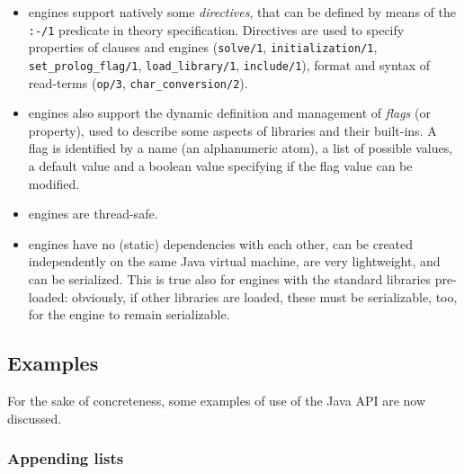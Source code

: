 \begin{itemize}
\item engines support natively some \emph{directives}, that can be defined by means of the \texttt{:-/1} predicate in theory specification.
    Directives are used to specify properties of clauses and engines (\texttt{solve/1}, \texttt{initialization/1}, \texttt{set\_prolog\_flag/1}, \texttt{load\_library/1}, \texttt{include/1}), format and syntax of read-terms (\texttt{op/3}, \texttt{char\_conversion/2}).

\item engines also support the dynamic definition and management of \emph{flags} (or property), used to describe some aspects of libraries and their built-ins.
    A flag is identified by a name (an alphanumeric atom), a list of possible values, a default value and a boolean value specifying if the flag value can be modified.

\item engines are thread-safe.

\item engines have no (static) dependencies with each other, can be created  independently on the same Java virtual machine, are very lightweight, and can be serialized.
    This is true also for engines with the standard libraries pre-loaded: obviously, if other libraries are loaded, these must be serializable, too, for the engine to remain serializable.
\end{itemize}

\subsection{Examples}
\label{ssec:java-api-examples}

For the sake of concreteness, some examples of use of the \tuprolog{} Java API are now discussed.

\subsubsection{Appending lists}

